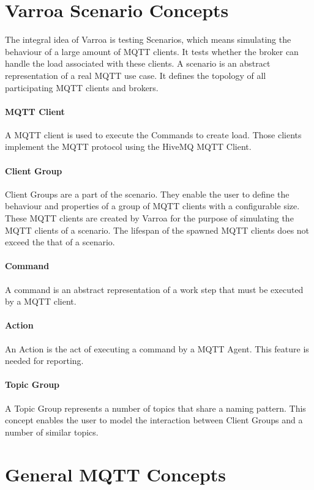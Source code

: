 \section{Varroa Scenario Concepts}
The integral idea of Varroa is testing Scenarios, which means simulating the behaviour of a large amount of MQTT clients.
It tests whether the broker can handle the load associated with these clients.
A scenario is an abstract representation of a real MQTT use case.
It defines the topology of all participating MQTT clients and brokers.

\paragraph{MQTT Client}
A MQTT client is used to execute the Commands to create load.
Those clients implement the MQTT protocol using the HiveMQ MQTT Client.

\paragraph{Client Group}
Client Groups are a part of the scenario.
They enable the user to define the behaviour and properties of a group of MQTT clients with a configurable size.
These MQTT clients are created by Varroa for the purpose of simulating the MQTT clients of a scenario.
The lifespan of the spawned MQTT clients does not exceed the that of a scenario.

\paragraph{Command}
A command is an abstract representation of a work step that must be executed by a MQTT client.

\paragraph{Action}
An Action is the act of executing a command by a MQTT Agent.
This feature is needed for reporting.

\paragraph{Topic Group}
A Topic Group represents a number of topics that share a naming pattern.
This concept enables the user to model the interaction between Client Groups and a number of similar topics.

\section{General MQTT Concepts}
